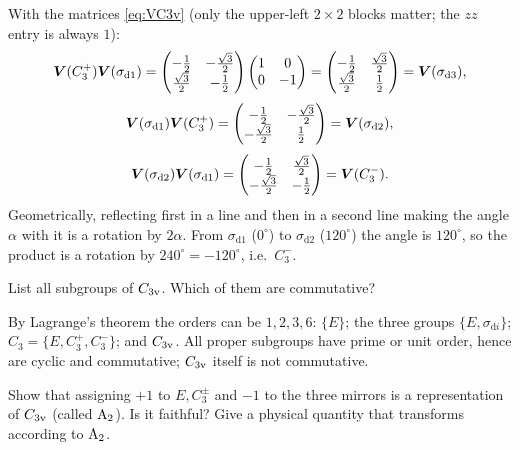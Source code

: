 \begin{solution}
With the matrices \eqref{eq:VC3v} (only the upper-left $2\times2$ blocks matter; the
$zz$ entry is always $1$):
\[
\bm{V}(C_3^+)\bm{V}(\sigma_{\mathrm{d}1})=
\begin{pmatrix}-\frac12&-\frac{\sqrt3}{2}\\ \frac{\sqrt3}{2}&-\frac12\end{pmatrix}
\begin{pmatrix}1&0\\0&-1\end{pmatrix}=
\begin{pmatrix}-\frac12&\frac{\sqrt3}{2}\\ \frac{\sqrt3}{2}&\frac12\end{pmatrix}
=\bm{V}(\sigma_{\mathrm{d}3}),
\]
\[
\bm{V}(\sigma_{\mathrm{d}1})\bm{V}(C_3^+)=
\begin{pmatrix}-\frac12&-\frac{\sqrt3}{2}\\ -\frac{\sqrt3}{2}&\frac12\end{pmatrix}
=\bm{V}(\sigma_{\mathrm{d}2}),
\]
\[
\bm{V}(\sigma_{\mathrm{d}2})\bm{V}(\sigma_{\mathrm{d}1})=
\begin{pmatrix}-\frac12&\frac{\sqrt3}{2}\\ -\frac{\sqrt3}{2}&-\frac12\end{pmatrix}
=\bm{V}(C_3^-).
\]
Geometrically, reflecting first in a line and then in a second line making the angle
$\alpha$ with it is a rotation by $2\alpha$. From $\sigma_{\mathrm{d}1}$ ($0^\circ$) to
$\sigma_{\mathrm{d}2}$ ($120^\circ$) the angle is $120^\circ$, so the product is a rotation
by $240^\circ=-120^\circ$, i.e.\ $C_3^-$.
\end{solution}

\begin{exercise}\label{ex:1:subgroups}
List all subgroups of $C_{3\mathrm{v}}$. Which of them are commutative?
\end{exercise}

\begin{solution}
By Lagrange's theorem the orders can be $1,2,3,6$: $\{E\}$; the three groups
$\{E,\sigma_{\mathrm{d}i}\}$; $C_3=\{E,C_3^+,C_3^-\}$; and $C_{3\mathrm{v}}$. All proper subgroups have
prime or unit order, hence are cyclic and commutative; $C_{3\mathrm{v}}$ itself is not
commutative.
\end{solution}

\begin{exercise}\label{ex:1:A2}
Show that assigning $+1$ to $E,C_3^\pm$ and $-1$ to the three mirrors is a
representation of $C_{3\mathrm{v}}$ (called $\mathrm{A}_2$). Is it faithful? Give a physical
quantity that transforms according to $\mathrm{A}_2$.
\end{exercise}

